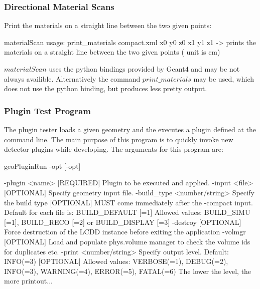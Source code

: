 \documentclass[10pt,a4paper]{article}
\begin{document}
\subsubsection{Directional Material Scans}
\label{sec:dd4hep-manual-directional-material-scans}
\noindent
Print the materials on a straight line between the two given points:
\begin{code}
materialScan
 usage: print_materials compact.xml x0 y0 z0 x1 y1 z1 
        -> prints the materials on a straight line between the two given points ( unit is cm) 
\end{code}
$materialScan$ uses the python bindings provided by Geant4 and may be not 
always availible. Alternatively the command $print\_materials$ may be used, 
which does not use the python binding, but produces less pretty output.

\subsubsection{Plugin Test Program}
\label{sec:dd4hep-manual-plugin-test}
\noindent
The plugin tester loads a given geometry and the executes a plugin
defined at the command line. The main purpose of this program is to quickly 
invoke new detector plugins while developing. The arguments for this 
program are:
\begin{code}
    geoPluginRun -opt [-opt]                                                
    
        -plugin <name>  [REQUIRED]  Plugin to be executed and applied.        
        -input  <file>  [OPTIONAL]  Specify geometry input file.              
        -build_type <number/string> Specify the build type                         
                     [OPTIONAL]     MUST come immediately after the -compact input.
                                    Default for each file is: BUILD_DEFAULT [=1]   
                                    Allowed values: BUILD_SIMU [=1], BUILD_RECO [=2] or BUILD_DISPLAY [=3]
        -destroy     [OPTIONAL]     Force destruction of the LCDD instance         
                                    before exiting the application                 
        -volmgr      [OPTIONAL]     Load and populate phys.volume manager to       
                                    check the volume ids for duplicates etc.       
        -print      <number/string> Specify output level. Default: INFO(=3)        
                     [OPTIONAL]     Allowed values: VERBOSE(=1), DEBUG(=2),        
                                    INFO(=3), WARNING(=4), ERROR(=5), FATAL(=6)    
                                    The lower the level, the more printout...      


\end{code}
\end{document}
